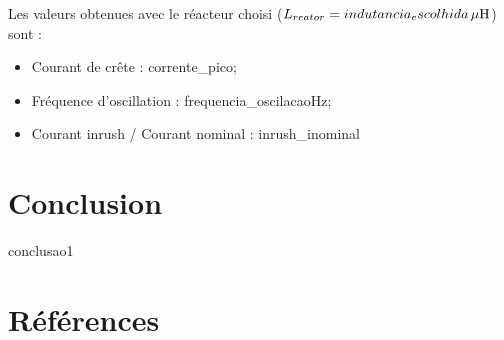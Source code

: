 \documentclass[a4paper]{article}
\begin{document}
	Les valeurs obtenues avec le réacteur choisi ($L_{reator} = {{indutancia_escolhida}} \, \mu \rm{H} $) sont :
	\begin{itemize}[label=\textendash]
		\item Courant de crête : {{corrente_pico}};
		\item Fréquence d'oscillation : {{frequencia_oscilacao}}Hz;
		\item Courant inrush / Courant nominal : {{inrush_inominal}}
	\end{itemize}
	
	\section{Conclusion}
	{{conclusao1}}
	
	\section{Références}
	
\end{document}
